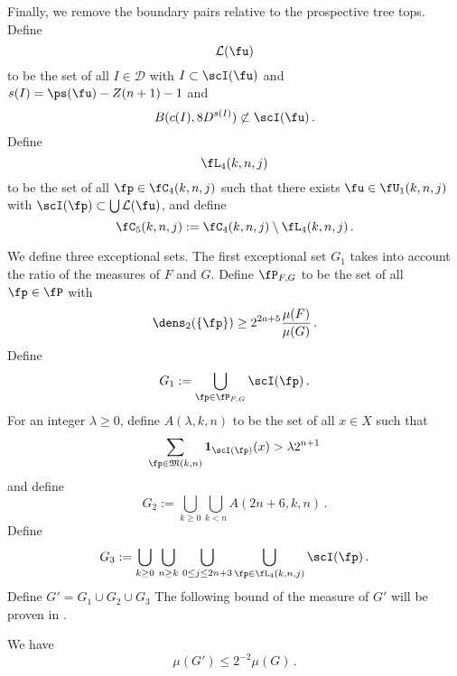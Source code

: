 Finally, we remove the boundary pairs relative to the prospective tree tops. Define
\begin{equation}
    \label{eq-L-def}
    \mathcal{L}(\fu)
\end{equation}
to be the set of all $I \in \mathcal{D}$ with $I \subset \scI(\fu)$ and $s(I) = \ps(\fu) - Z(n+1) - 1$ and
\begin{equation}
    B(c(I), 8 D^{s(I)})\not \subset \scI(\fu)\, .
\end{equation}
Define
\begin{equation}
    \label{eq-L4-def}
    \fL_4(k,n,j)
\end{equation}
to be the set of all $\fp\in \fC_4(k,n,j)$ such that there exists
$\fu\in \fU_1(k,n,j)$
with $\scI(\fp) \subset \bigcup \mathcal{L}(\fu)$, and define
\begin{equation}\label{defc5}
\fC_5(k,n,j):=\fC_4(k,n,j)
  \setminus \fL_4(k,n,j)\, .
\end{equation}


We define three exceptional sets.
The first exceptional set $G_1$ takes into account the ratio of the measures of $F$ and $G$.
Define $\fP_{F,G}$ to be the set of all $\fp\in \fP$
with
\begin{equation}
    \dens_2(\{\fp\})\ge 2^{2a+5}\frac{\mu(F)}{\mu(G)}\,.
\end{equation}
Define
\begin{equation}\label{definegone}
    G_1:=\bigcup_{\fp\in \fP_{F,G} }\scI(\fp)\, .
\end{equation}
For an integer $\lambda\ge 0$, define $A(\lambda,k,n)$ to be the set
of all $x\in X$ such that
\begin{equation}
    \label{eq-Aoverlap-def}
    \sum_{\fp \in \mathfrak{M}(k,n)}\mathbf{1}_{\scI(\fp)}(x)>\lambda 2^{n+1}
\end{equation}
and define
\begin{equation}\label{definegone2}
    G_2:=
\bigcup_{k\ge 0}\bigcup_{k< n}
A(2n+6,k,n)\, .
\end{equation}
Define
    \begin{equation}\label{defineg3}
        G_3 :=
        \bigcup_{k\ge 0}\, \bigcup_{n \geq k}\,
        \bigcup_{0\le j\le 2n+3}
        \bigcup_{\fp \in \fL_4 (k,n,j)}
        \scI(\fp)\, .
     \end{equation}
Define $G'=G_1\cup G_2 \cup G_3$
The following bound of the measure of $G'$ will be proven in
.
\begin{lemma}
    \label{exceptional-set}
    \leanok
    We have
    \begin{equation}
        \mu(G')\le 2^{-2}\mu(G)\, .
    \end{equation}
\end{lemma}

